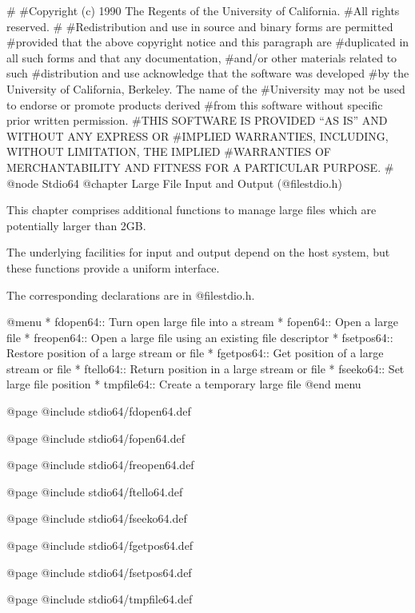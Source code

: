 #
#Copyright (c) 1990 The Regents of the University of California.
#All rights reserved.
#
#Redistribution and use in source and binary forms are permitted
#provided that the above copyright notice and this paragraph are
#duplicated in all such forms and that any documentation,
#and/or other materials related to such
#distribution and use acknowledge that the software was developed
#by the University of California, Berkeley.  The name of the
#University may not be used to endorse or promote products derived
#from this software without specific prior written permission.
#THIS SOFTWARE IS PROVIDED ``AS IS'' AND WITHOUT ANY EXPRESS OR
#IMPLIED WARRANTIES, INCLUDING, WITHOUT LIMITATION, THE IMPLIED
#WARRANTIES OF MERCHANTABILITY AND FITNESS FOR A PARTICULAR PURPOSE.
#
@node Stdio64
@chapter Large File Input and Output (@file{stdio.h}) 

This chapter comprises additional functions to manage large files which
are potentially larger than 2GB.

The underlying facilities for input and output depend on the host
system, but these functions provide a uniform interface.

The corresponding declarations are in @file{stdio.h}.

@menu
* fdopen64::    Turn open large file into a stream
* fopen64::     Open a large file
* freopen64::   Open a large file using an existing file descriptor
* fsetpos64::   Restore position of a large stream or file
* fgetpos64::   Get position of a large stream or file
* ftello64::    Return position in a large stream or file
* fseeko64::    Set large file position
* tmpfile64::   Create a temporary large file
@end menu 

@page
@include stdio64/fdopen64.def

@page
@include stdio64/fopen64.def

@page
@include stdio64/freopen64.def

@page 
@include stdio64/ftello64.def 

@page
@include stdio64/fseeko64.def

@page
@include stdio64/fgetpos64.def

@page
@include stdio64/fsetpos64.def

@page
@include stdio64/tmpfile64.def

